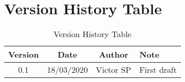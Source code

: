 \section{Version History Table}

\begin{table}[h]
	\centering
	\begin{tabular}{|c|c|c|l|}
		\hline
		Version & Date       & Author     & Note                                \\ \hline
		0.1     & 18/03/2020 & Victor SP  & First draft                         \\ \hline
	\end{tabular}
	\caption{Version History Table}
	\label{tab:version-table}
\end{table}
